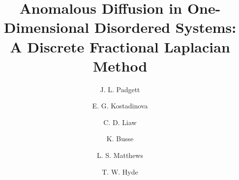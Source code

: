 \documentclass[final,1p,times]{elsarticle}
\theoremstyle{remark}
\theoremstyle{definition}
\begin{document}
\begin{frontmatter}



\title{Anomalous Diffusion in One-Dimensional Disordered Systems: A Discrete Fractional Laplacian Method}


\author[ttu,ttu1]{J. L. Padgett}
\address[ttu1]{Department of Mathematics and Statistics, Texas Tech University, Broadway and Boston, Lubbock, TX, 79409, USA}

\author[bu]{E. G. Kostadinova}

\author[bu,d]{C. D. Liaw}

\author[bu]{K. Busse}

\author[bu]{L. S. Matthews}

\author[bu]{T. W. Hyde}

\address[bu]{Center for Astrophysics, Space Physics, and Engineering Research and Department of Physics, One Bear Place, 97310, Baylor University, Waco, TX, 76706, USA}

\address[d]{Department of Mathematical Sciences, University of Delaware, 311 Ewing Hall, Newark, DE, 19716, USA}


\end{frontmatter}
\end{document}
